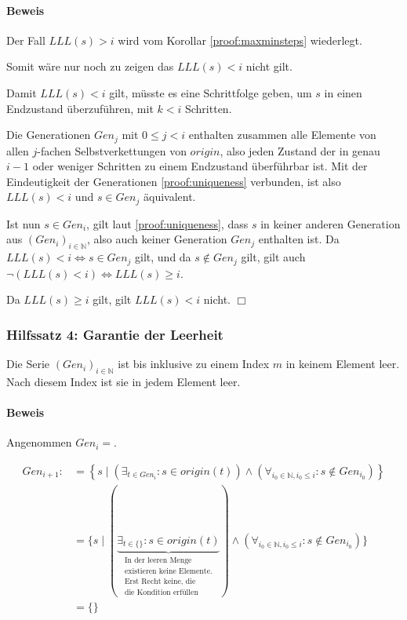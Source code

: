 \documentclass[a4paper,10pt,ngerman]{scrartcl}
\begin{document}
\paragraph{Beweis}

Der Fall \(LLL(s) > i\) wird vom Korollar \cref{proof:maxminsteps} wiederlegt.

Somit wäre nur noch zu zeigen das \(LLL(s) < i\) nicht gilt.

Damit \(LLL(s) < i\) gilt, müsste es eine Schrittfolge geben, um \(s\) in einen Endzustand überzuführen, mit \(k < i\) Schritten.

Die Generationen \(Gen_j\) mit \(0 \leq j < i\) enthalten zusammen alle Elemente von allen \(j\)-fachen Selbstverkettungen von \(origin\), also jeden Zustand der in genau \(i-1\) oder weniger Schritten zu einem Endzustand überführbar ist. Mit der Eindeutigkeit der Generationen \cref{proof:uniqueness} verbunden, ist also \(LLL(s) < i\) und \(s \in Gen_j\) äquivalent.

Ist nun \(s \in Gen_i\), gilt laut \cref{proof:uniqueness}, dass \(s\) in keiner anderen Generation aus \((Gen_i)_{i\in\mathbb{N}}\), also auch keiner Generation \(Gen_j\) enthalten ist. Da \(LLL(s) < i \iff s \in Gen_j\) gilt, und da \(s \notin Gen_j\) gilt, gilt auch \(\lnot(LLL(s) < i) \iff LLL(s) \geq i\).

Da \(LLL(s) \geq i\) gilt, gilt \(LLL(s) < i\) nicht. \(\Box\)

\subsubsection{Hilfssatz 4: Garantie der Leerheit} \label{proof:termination}

Die Serie \((Gen_i)_{i\in\mathbb{N}}\) ist bis inklusive zu einem Index \(m\) in keinem Element leer. Nach diesem Index ist sie in jedem Element leer.

\paragraph{Beweis}

Angenommen \(Gen_i = {}\).

\begin{align*}
    Gen_{i+1} :&= \left\{ s \mid \left(\exists_{t \in Gen_i} : s \in origin(t)\right) \land \left(\forall_{i_0\in\mathbb{N}, i_0 \leq i}: s \notin Gen_{i_0}\right) \right\} \\
    & = \{ s \mid (\underbrace{\exists_{t \in \{\}} : s \in origin(t)}_{\substack{\text{In der leeren Menge}\\\text{existieren keine Elemente.}\\\text{Erst Recht keine, die}\\\text{die Kondition erfüllen}}}) \land (\forall_{i_0\in\mathbb{N}, i_0 \leq i}: s \notin Gen_{i_0}) \} \\
    & = \{\} \\
\end{align*}
\end{document}
